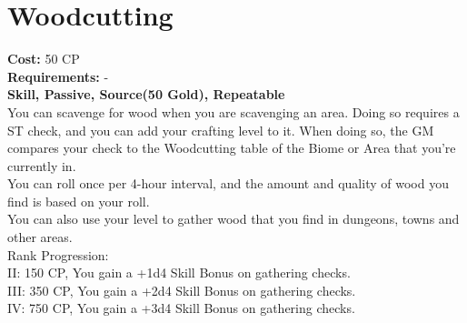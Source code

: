 \section{Woodcutting}\label{perk:woodcutting}
\textbf{Cost:} 50 CP\\
\textbf{Requirements:} -\\
\textbf{Skill, Passive, Source(50 Gold), Repeatable}\\
You can scavenge for wood when you are scavenging an area.
Doing so requires a ST check, and you can add your crafting level to it.
When doing so, the GM compares your check to the Woodcutting table of the Biome or Area that you're currently in.\\
You can roll once per 4-hour interval, and the amount and quality of wood you find is based on your roll.\\
You can also use your level to gather wood that you find in dungeons, towns and other areas.
\\
Rank Progression:\\
II: 150 CP, You gain a +1d4 Skill Bonus on gathering checks.\\
III: 350 CP, You gain a +2d4 Skill Bonus on gathering checks.\\
IV: 750 CP, You gain a +3d4 Skill Bonus on gathering checks.\\